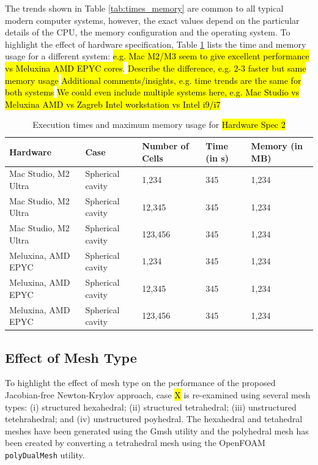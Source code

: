 \documentclass[sn-mathphys,Numbered,draft]{sn-jnl}%
\begin{document}
The trends shown in Table \ref{tab:times_memory} are common to all typical modern computer systems, however, the exact values depend on the particular details of the CPU, the memory configuration and the operating system.
To highlight the effect of hardware specification, Table \ref{tab:times_memory_spec2} lists the time and memory usage for a different system: \hl{e.g. Mac M2/M3 seem to give excellent performance vs Meluxina AMD EPYC cores}.
\hl{Describe the difference, e.g. 2-3 faster but same memory usage}
\hl{Additional comments/insights, e.g. time trends are the same for both systems}
\hl{We could even include multiple systems here, e.g. Mac Studio vs Meluxina AMD vs Zagreb Intel workstation vs Intel i9/i7}
\begin{table}[htb]
	\centering
		\begin{tabular}{lllll}
			\hline
			Hardware & Case & Number of Cells & Time (in s) & Memory (in MB) \\
			\hline 
			Mac Studio, M2 Ultra & Spherical cavity & 1,234 & 345 & 1,234  \\
			Mac Studio, M2 Ultra & Spherical cavity & 12,345 & 345 & 1,234  \\
			Mac Studio, M2 Ultra & Spherical cavity & 123,456 & 345 & 1,234  \\
			Meluxina, AMD EPYC & Spherical cavity & 1,234 & 345 & 1,234  \\
			Meluxina, AMD EPYC & Spherical cavity & 12,345 & 345 & 1,234  \\
			Meluxina, AMD EPYC & Spherical cavity & 123,456 & 345 & 1,234  \\
			\hline
		\end{tabular}
	\caption{Execution times and maximum memory usage for \hl{Hardware Spec 2}}
	\label{tab:times_memory_spec2}
\end{table}


\subsection{Effect of Mesh Type}
To highlight the effect of mesh type on the performance of the proposed Jacobian-free Newton-Krylov approach, case \hl{X} is re-examined using several mesh types:
(i) structured hexahedral; (ii) structured tetrahedral; (iii) unstructured tetehrahedral; and (iv) unstructured poyhedral.
The hexahedral and tetahedral meshes have been generated using the Gmsh utility \citep{Gmsh} and the polyhedral mesh has been created by converting a tetrahedral mesh using the OpenFOAM \texttt{polyDualMesh} utility.
\end{document}
